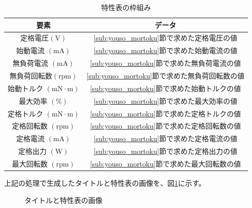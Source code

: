 \begin{table}[t]
	\centering
	\caption{特性表の枠組み}
	\begin{tabular}{|c|c|} \hline
	  要素 & データ \\ \hline \hline
	  定格電圧$(\mathrm{V})$ & \ref{sub:youso_mortoku}節で求めた定格電圧の値 \\ \hline
      始動電流 $(\mathrm{mA})$&  \ref{sub:youso_mortoku}節で求めた始動電流の値 \\ \hline
      無負荷電流 $(\mathrm{mA})$&  \ref{sub:youso_mortoku}節で求めた無負荷電流の値\\ \hline
      無負荷回転数$(\mathrm{rpm})$& \ref{sub:youso_mortoku}節で求めた無負荷回転数の値  \\ \hline
	  始動トルク $(\mathrm{mN \cdot m})$& \ref{sub:youso_mortoku}節で求めた始動トルクの値  \\ \hline
      最大効率 $(\mathrm{\%})$& \ref{sub:youso_mortoku}節で求めた最大効率の値  \\ \hline
      定格トルク $(\mathrm{mN \cdot m})$& \ref{sub:youso_mortoku}節で求めた定格トルクの値 \\ \hline
	  定格回転数 $(\mathrm{rpm})$& \ref{sub:youso_mortoku}節で求めた定格回転数の値  \\ \hline
      定格電流 $(\mathrm{mA})$& \ref{sub:youso_mortoku}節で求めた定格電流の値  \\ \hline
      定格出力 $(\mathrm{W})$& \ref{sub:youso_mortoku}節で求めた定格出力の値 \\ \hline
	  最大回転数 $(\mathrm{rpm})$&  \ref{sub:youso_mortoku}節で求めた最大回転数の値 \\ \hline
	\end{tabular}
	\label{tab:wakugumi}
  \end{table}

上記の処理で生成したタイトルと特性表の画像を、図\ref{fig:toku_gazou}に示す。
% 	
\begin{figure}[t]
    \centering
    \caption{タイトルと特性表の画像}
	\label{fig:toku_gazou}
\end{figure}


